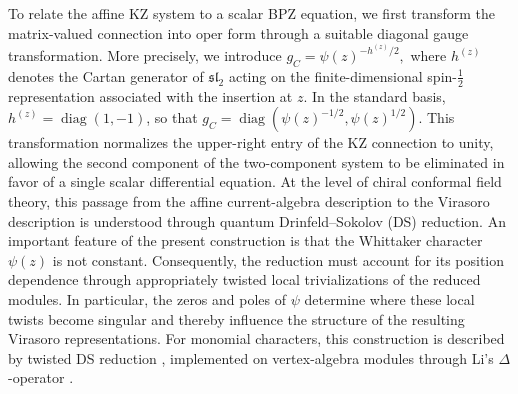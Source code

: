 \documentclass[a4paper,11pt]{article}
\numberwithin{equation}{section}
\begin{document}
To relate the affine KZ system to a scalar BPZ equation, we first transform the matrix-valued connection into oper form through a suitable diagonal gauge transformation. More precisely, we introduce
$g_C=\psi(z)^{-h^{(z)}/2}, $
where $h^{(z)}$ denotes the Cartan generator of $\mathfrak{sl}_2$ acting on the finite-dimensional spin-$\frac12$ representation associated with the insertion at $z$. In the standard basis, $h^{(z)}=\operatorname{diag}(1,-1)$, so that $g_C=\operatorname{diag}(\psi(z)^{-1/2},\psi(z)^{1/2})$. This transformation normalizes the upper-right entry of the KZ connection to unity, allowing the second component of the two-component system to be eliminated in favor of a single scalar differential equation. At the level of chiral conformal field theory, this passage from the affine current-algebra description to the Virasoro description is understood through quantum Drinfeld–Sokolov (DS) reduction. An important feature of the present construction is that the Whittaker character $\psi(z)$ is not constant. Consequently, the reduction must account for its position dependence through appropriately twisted local trivializations of the reduced modules. In particular, the zeros and poles of $\psi$ determine where these local twists become singular and thereby influence the structure of the resulting Virasoro representations. For monomial characters, this construction is described by twisted DS reduction \cite{ArakawaFrenkel2019}, implemented on vertex-algebra modules through Li's $\Delta$-operator \cite{Li1997} .

\end{document}
